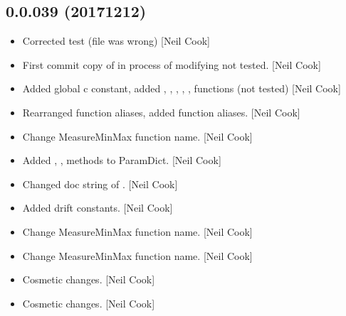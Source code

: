 \documentclass[a4paper,10pt,english]{report}
\begin{document}
\subsection{0.0.039 (2017\sphinxhyphen{}12\sphinxhyphen{}12)}
\label{\detokenize{misc/changelog:id531}}\begin{itemize}
\item {} 
Corrected  test (file was wrong) {[}Neil Cook{]}

\item {} 
First commit \sphinxhyphen{} copy of  \sphinxhyphen{} in process of modifying \sphinxhyphen{} not
tested. {[}Neil Cook{]}

\item {} 
Added global c constant, added , ,
, , , 
functions (not tested) {[}Neil Cook{]}

\item {} 
Rearranged function aliases, added  function aliases. {[}Neil
Cook{]}

\item {} 
Change MeasureMinMax function name. {[}Neil Cook{]}

\item {} 
Added , ,  methods to ParamDict.
{[}Neil Cook{]}

\item {} 
Changed doc string of . {[}Neil Cook{]}

\item {} 
Added drift constants. {[}Neil Cook{]}

\item {} 
Change MeasureMinMax function name. {[}Neil Cook{]}

\item {} 
Change MeasureMinMax function name. {[}Neil Cook{]}

\item {} 
Cosmetic changes. {[}Neil Cook{]}

\item {} 
Cosmetic changes. {[}Neil Cook{]}

\end{itemize}
\end{document}
